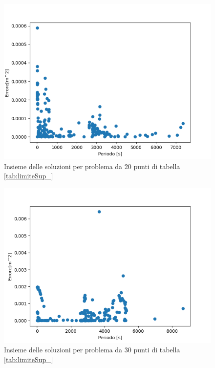 \documentclass[a4paper,12pt]{report}
\begin{document}
\begin{itemize}
  \begin{figure}[H]
    \centering
    \includegraphics[scale=0.70]{img/puls0013/puntoUtopia20.png}
    \caption{Insieme delle soluzioni per problema da 20 punti di tabella \ref{tab:limiteSup_}}
    \label{fig:reg_ammis_20_0013}
  \end{figure}

  \begin{figure}[H]
    \centering
    \includegraphics[scale=0.70]{img/puls0013/puntoUtopia30.png}
    \caption{Insieme delle soluzioni per problema da 30 punti di tabella \ref{tab:limiteSup_}}
    \label{fig:reg_ammis_30_0013}
  \end{figure}



\end{itemize}
\end{document}
